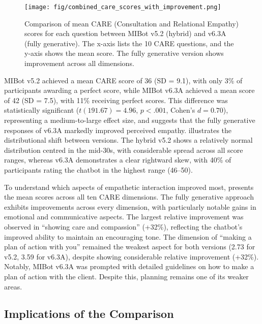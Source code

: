 \begin{figure}[htbp]
	\centering
	\texttt{[image: fig/combined\_care\_scores\_with\_improvement.png]}
	\caption[Comparison of Mean CARE Scores per Question]{Comparison of mean CARE (Consultation and Relational Empathy) scores for each question between MIBot v5.2 (hybrid) and v6.3A (fully generative). The x-axis lists the 10 CARE questions, and the y-axis shows the mean score. The fully generative version shows improvement across all dimensions.}
	\label{fig:care_questions}
\end{figure}

MIBot v5.2 achieved a mean CARE score of 36 (SD = 9.1), with only 3\% of participants awarding a perfect score, while MIBot v6.3A achieved a mean score of 42 (SD = 7.5), with 11\% receiving perfect scores. This difference was statistically significant ($t(191.67) = 4.96$, $p < .001$, Cohen's $d = 0.70$), representing a medium-to-large effect size, and suggests that the fully generative responses of v6.3A markedly improved perceived empathy.  illustrates the distributional shift between versions. The hybrid v5.2 shows a relatively normal distribution centred in the mid-30s, with considerable spread across all score ranges, whereas v6.3A demonstrates a clear rightward skew, with 40\% of participants rating the chatbot in the highest range (46--50).

To understand which aspects of empathetic interaction improved most,  presents the mean scores across all ten CARE dimensions. The fully generative approach exhibits improvements across every dimension, with particularly notable gains in emotional and communicative aspects. The largest relative improvement was observed in ``showing care and compassion'' (+32\%), reflecting the chatbot's improved ability to maintain an encouraging tone. The dimension of ``making a plan of action with you'' remained the weakest aspect for both versions (2.73 for v5.2, 3.59 for v6.3A), despite showing considerable relative improvement (+32\%). Notably, MIBot v6.3A was prompted with detailed guidelines on how to make a plan of action with the client. Despite this, planning remains one of its weaker areas.



\subsection*{Implications of the Comparison}

